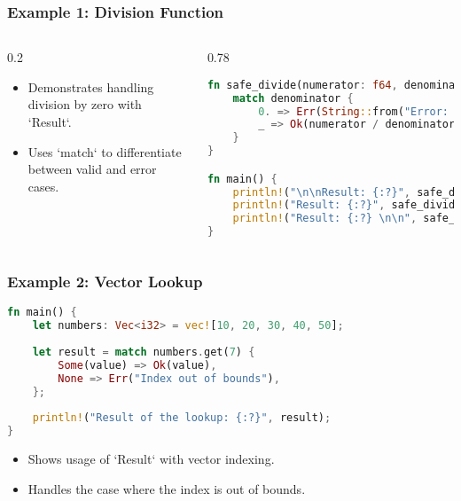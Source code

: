 \documentclass[aspectratio=169, table]{beamer}
\begin{document}
\begin{frame}[fragile]
\frametitle{Example 1: Division Function}
\vspace{40pt}
\begin{columns}[T]
\begin{column}{0.2\textwidth}
	\begin{itemize}
		\item Demonstrates handling division by zero with `Result`.
		\item Uses `match` to differentiate between valid and error cases.
	\end{itemize}
\end{column}
\begin{column}{0.78\textwidth}
\begin{lstlisting}[language=Rust]
fn safe_divide(numerator: f64, denominator: f64) -> Result<f64, String> {
	match denominator {
		0. => Err(String::from("Error: Cannot divide by zero")),
		_ => Ok(numerator / denominator),
	}
}

fn main() {
	println!("\n\nResult: {:?}", safe_divide(18.0, 6.0));  
	println!("Result: {:?}", safe_divide(5.0, 0.0));
	println!("Result: {:?} \n\n", safe_divide(0.0, 3.0));
}
\end{lstlisting}
\end{column}
\end{columns}
\end{frame}


\begin{frame}[fragile]
\frametitle{Example 2: Vector Lookup}
\begin{lstlisting}[language=Rust]
fn main() {
	let numbers: Vec<i32> = vec![10, 20, 30, 40, 50];
	
	let result = match numbers.get(7) {
		Some(value) => Ok(value),
		None => Err("Index out of bounds"),
	};
	
	println!("Result of the lookup: {:?}", result);
}
\end{lstlisting}
\begin{itemize}
\item Shows usage of `Result` with vector indexing.
\item Handles the case where the index is out of bounds.
\end{itemize}
\end{frame}
\end{document}
